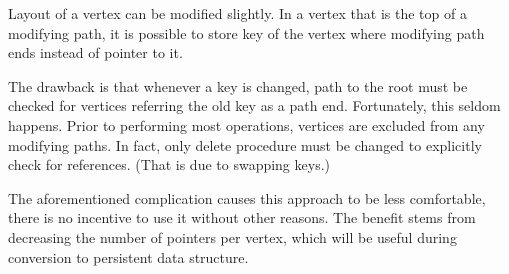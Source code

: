Layout of a vertex can be modified slightly. In a vertex that is the top of a modifying path, it is possible to store key of the vertex where modifying path ends instead of pointer to it.

The drawback is that whenever a key is changed, path to the root must be checked for vertices referring the old key as a path end. Fortunately, this seldom happens. Prior to performing most operations, vertices are excluded from any modifying paths. In fact, only delete procedure must be changed to explicitly check for references. (That is due to swapping keys.)

The aforementioned complication causes this approach to be less comfortable, there is no incentive to use it without other reasons. The benefit stems from decreasing the number of pointers per vertex, which will be useful during conversion to persistent data structure.
